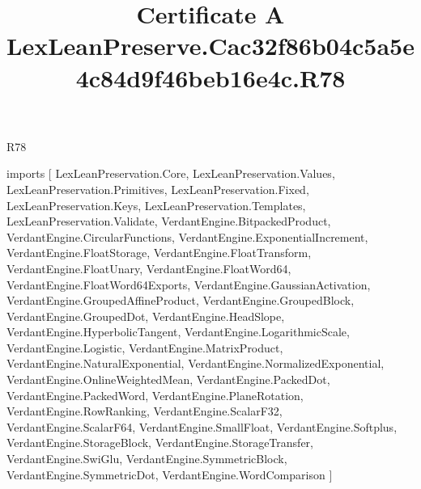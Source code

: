 \begin{lexlean}{R78}
\title{Certificate A LexLeanPreserve.Cac32f86b04c5a5e4c84d9f46beb16e4c.R78}
\begin{coremodule}
imports [
  LexLeanPreservation.Core,
  LexLeanPreservation.Values,
  LexLeanPreservation.Primitives,
  LexLeanPreservation.Fixed,
  LexLeanPreservation.Keys,
  LexLeanPreservation.Templates,
  LexLeanPreservation.Validate,
  VerdantEngine.BitpackedProduct,
  VerdantEngine.CircularFunctions,
  VerdantEngine.ExponentialIncrement,
  VerdantEngine.FloatStorage,
  VerdantEngine.FloatTransform,
  VerdantEngine.FloatUnary,
  VerdantEngine.FloatWord64,
  VerdantEngine.FloatWord64Exports,
  VerdantEngine.GaussianActivation,
  VerdantEngine.GroupedAffineProduct,
  VerdantEngine.GroupedBlock,
  VerdantEngine.GroupedDot,
  VerdantEngine.HeadSlope,
  VerdantEngine.HyperbolicTangent,
  VerdantEngine.LogarithmicScale,
  VerdantEngine.Logistic,
  VerdantEngine.MatrixProduct,
  VerdantEngine.NaturalExponential,
  VerdantEngine.NormalizedExponential,
  VerdantEngine.OnlineWeightedMean,
  VerdantEngine.PackedDot,
  VerdantEngine.PackedWord,
  VerdantEngine.PlaneRotation,
  VerdantEngine.RowRanking,
  VerdantEngine.ScalarF32,
  VerdantEngine.ScalarF64,
  VerdantEngine.SmallFloat,
  VerdantEngine.Softplus,
  VerdantEngine.StorageBlock,
  VerdantEngine.StorageTransfer,
  VerdantEngine.SwiGlu,
  VerdantEngine.SymmetricBlock,
  VerdantEngine.SymmetricDot,
  VerdantEngine.WordComparison
]


\end{coremodule}
\end{lexlean}
